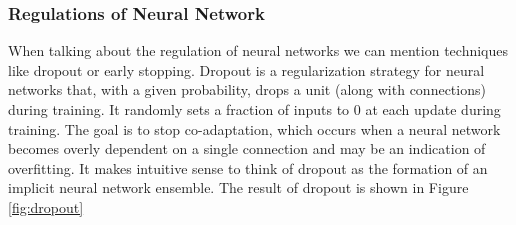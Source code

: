 \subsubsection*{Regulations of Neural Network}
When talking about the regulation of neural networks we can mention techniques like dropout or early stopping.\newline
Dropout is a regularization strategy for neural networks that, with a given probability, drops a unit (along with connections) during training. It randomly sets a fraction of inputs to 0 at each update during training.
The goal is to stop co-adaptation, which occurs when a neural network becomes overly dependent on a single connection and may be an indication of overfitting. It makes intuitive sense to think of dropout as the formation of an implicit neural network ensemble. The result of dropout is shown in Figure \ref{fig:dropout}
\def\layersep{2}
\def\nodesep{1.5}
